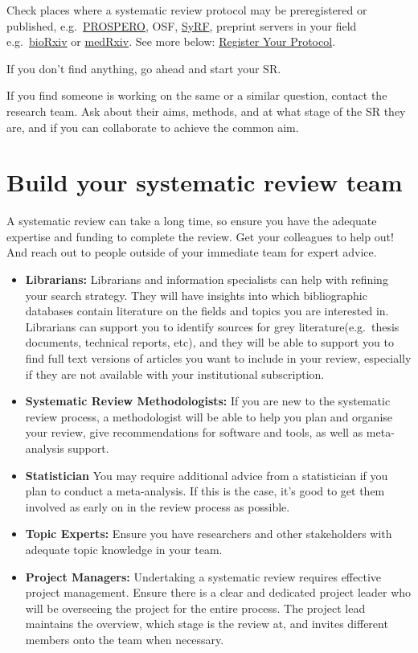 \documentclass[
]{book}
\begin{document}
Check places where a systematic review protocol may be preregistered or published, e.g.~\href{https://www.crd.york.ac.uk/prospero/}{PROSPERO}, OSF, \href{https://syrf.org.uk/}{SyRF}, preprint servers in your field e.g.~\href{https://www.biorxiv.org/}{bioRxiv} or \href{https://www.medrxiv.org/}{medRxiv}. See more below: \hyperref[register-your-protocol]{Register Your Protocol}.

If you don't find anything, go ahead and start your SR.

If you find someone is working on the same or a similar question, contact the research team. Ask about their aims, methods, and at what stage of the SR they are, and if you can collaborate to achieve the common aim.

\section{Build your systematic review team}\label{build-your-systematic-review-team}

A systematic review can take a long time, so ensure you have the adequate expertise and funding to complete the review. Get your colleagues to help out! And reach out to people outside of your immediate team for expert advice.

\begin{itemize}
\item
  \textbf{Librarians:} Librarians and information specialists can help with refining your search strategy. They will have insights into which bibliographic databases contain literature on the fields and topics you are interested in. Librarians can support you to identify sources for grey literature(e.g.~thesis documents, technical reports, etc), and they will be able to support you to find full text versions of articles you want to include in your review, especially if they are not available with your institutional subscription.
\item
  \textbf{Systematic Review Methodologists:} If you are new to the systematic review process, a methodologist will be able to help you plan and organise your review, give recommendations for software and tools, as well as meta-analysis support.
\item
  \textbf{Statistician} You may require additional advice from a statistician if you plan to conduct a meta-analysis. If this is the case, it's good to get them involved as early on in the review process as possible.
\item
  \textbf{Topic Experts:} Ensure you have researchers and other stakeholders with adequate topic knowledge in your team.
\item
  \textbf{Project Managers:} Undertaking a systematic review requires effective project management. Ensure there is a clear and dedicated project leader who will be overseeing the project for the entire process. The project lead maintains the overview, which stage is the review at, and invites different members onto the team when necessary.
\end{itemize}
\end{document}
